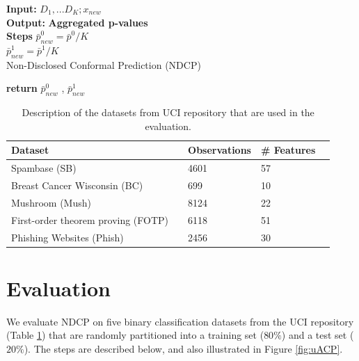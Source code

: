 \documentclass[preprint,12pt,authoryear]{elsarticle}
\begin{document}
 \begin{algorithm}[H]
 \textbf{Input:}{ $D_1,...D_K  ;  x_{new}$}\\
 \textbf{Output:}{\textbf{ Aggregated p-values} }\\
 \textbf{Steps\;}
$\bar{p}_{new}^0 = \bar{p}^0 / K$\\   
$\bar{p}_{new}^1 = \bar{p}^1 / K$\\   
 \caption{Non-Disclosed Conformal Prediction (NDCP)} \label{algo:NDCP}
 \textbf{return} $\bar{p}_{new}^0$ , $\bar{p}_{new}^1$
 \end{algorithm}
 


\begin{table} [b]
\caption{Description of the datasets from UCI repository that are used in the evaluation.} \centering
\vspace{1em}
\begin{tabular}{llllc}
\toprule
Dataset && Observations & \# Features \\
\midrule
Spambase (SB) & & 4601 & 57 \\
\hline
Breast Cancer Wisconsin (BC)  & & 699 & 10 \\
\hline
Mushroom (Mush)& & 8124 & 22 \\
\hline
 First-order theorem proving (FOTP) & & 6118 & 51 \\
\hline
Phishing Websites (Phish) & & 2456 & 30 \\

\bottomrule
\end{tabular}\label{tab:datasets}
\end{table}



\section{Evaluation}

We evaluate NDCP on five binary classification datasets from the UCI repository (Table \ref{tab:datasets}) that are randomly partitioned into a training set ($80\%$) and a test set ($20\%$). The steps are described below, and also illustrated in Figure \ref{fig:uACP}.
\end{document}
